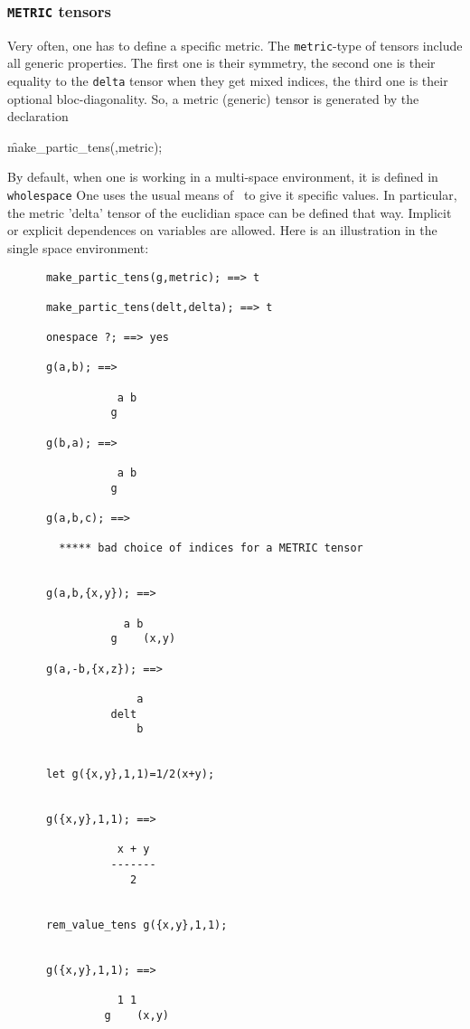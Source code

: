 \subsubsection{\texttt{METRIC} tensors}
Very often, one has to define a specific metric. The \texttt{metric}-type
of tensors include all generic properties. The first one is their symmetry,
the second one is their equality to the \texttt{delta}  tensor
when they get mixed indices, the third one is their optional bloc-diagonality.
So, a metric (generic) tensor is generated by the declaration
\begin{syntax}
      \f{make\_partic\_tens}(,metric);
\end{syntax} 
By default, when one is working in a multi-space environment, it is
defined in  \texttt{wholespace}
One uses the usual means of \REDUCE\ to give it specific values.
In particular, the metric 'delta' tensor of the euclidian space
can be defined that way.
Implicit or explicit dependences on variables are allowed.
Here is an illustration in the single space environment:
\begin{verbatim}
      make_partic_tens(g,metric); ==> t

      make_partic_tens(delt,delta); ==> t

      onespace ?; ==> yes

      g(a,b); ==>

                 a b
                g

      g(b,a); ==>

                 a b
                g

      g(a,b,c); ==>

        ***** bad choice of indices for a METRIC tensor


      g(a,b,{x,y}); ==>

                  a b
                g    (x,y)

      g(a,-b,{x,z}); ==>

                    a
                delt
                    b


      let g({x,y},1,1)=1/2(x+y);


      g({x,y},1,1); ==>

                 x + y
                -------
                   2


      rem_value_tens g({x,y},1,1);


      g({x,y},1,1); ==>

                 1 1
               g    (x,y)
\end{verbatim}

